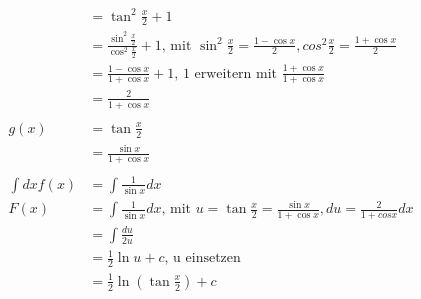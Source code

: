 \documentclass{standalone}
\begin{document}
\begin{enumerate}[a)]
\begin{align}
        &= \tan^2 \frac{x}{2} + 1 \\
        &= \frac{\sin^2 \frac{x}{2}}{\cos^2 \frac{x}{2}} + 1 \text{, mit } \sin^2 \frac{x}{2} = \frac{1-\cos x}{2}, cos^2 \frac{x}{2}= \frac{1+\cos x}{2} \\
        &= \frac{1-\cos x}{1+\cos x} + 1 \text{, 1 erweitern mit } \frac{1+\cos x}{1+\cos x}\\
        &= \frac{2}{1+\cos x} \\
        \\
        g(x) &= \tan \frac{x}{2} \\
        &= \frac{\sin x}{1+\cos x} \\
        \\
        \int dx f(x) &= \int \frac{1}{\sin x} dx \\
        F(x) &= \int \frac{1}{\sin x} dx \text{, mit } u = \tan \frac{x}{2} = \frac{\sin x}{1+\cos x}, du=\frac{2}{1+cos x}dx \\
        &= \int \frac{du}{2u} \\
        &= \frac{1}{2} \ln u + c \text{, u einsetzen} \\
        &= \frac{1}{2} \ln (\tan \frac{x}{2}) + c
    \end{align}
\end{enumerate}
\end{document}
